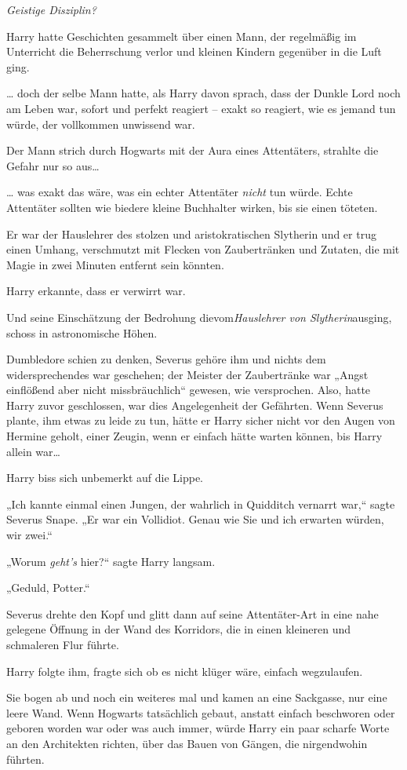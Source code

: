 {\emph{Geistige Disziplin?}

Harry hatte Geschichten gesammelt über einen Mann, der regelmäßig im Unterricht die Beherrschung verlor und kleinen Kindern gegenüber in die Luft ging.

… doch der selbe Mann hatte, als Harry davon sprach, dass der Dunkle Lord noch am Leben war, sofort und perfekt reagiert -- exakt so reagiert, wie es jemand tun würde, der vollkommen unwissend war.

Der Mann strich durch Hogwarts mit der Aura eines Attentäters, strahlte die Gefahr nur so aus…

… was exakt das wäre, was ein echter Attentäter \emph{nicht} tun würde. Echte Attentäter sollten wie biedere kleine Buchhalter wirken, bis sie einen töteten.

Er war der Hauslehrer des stolzen und aristokratischen Slytherin und er trug einen Umhang, verschmutzt mit Flecken von Zaubertränken und Zutaten, die mit Magie in zwei Minuten entfernt sein könnten.

Harry erkannte, dass er verwirrt war.

Und seine Einschätzung der Bedrohung dievom\emph{Hauslehrer von Slytherin}ausging, schoss in astronomische Höhen.

Dumbledore schien zu denken, Severus gehöre ihm und nichts dem widersprechendes war geschehen; der Meister der Zaubertränke war „Angst einflößend aber nicht missbräuchlich“ gewesen, wie versprochen. Also, hatte Harry zuvor geschlossen, war dies Angelegenheit der Gefährten. Wenn Severus plante, ihm etwas zu leide zu tun, hätte er Harry sicher nicht vor den Augen von Hermine geholt, einer Zeugin, wenn er einfach hätte warten können, bis Harry allein war…

Harry biss sich unbemerkt auf die Lippe.

„Ich kannte einmal einen Jungen, der wahrlich in Quidditch vernarrt war,“ sagte Severus Snape. „Er war ein Vollidiot. Genau wie Sie und ich erwarten würden, wir zwei.“

„Worum \emph{geht's} hier?“ sagte Harry langsam.

„Geduld, Potter.“

Severus drehte den Kopf und glitt dann auf seine Attentäter-Art in eine nahe gelegene Öffnung in der Wand des Korridors, die in einen kleineren und schmaleren Flur führte.

Harry folgte ihm, fragte sich ob es nicht klüger wäre, einfach wegzulaufen.

Sie bogen ab und noch ein weiteres mal und kamen an eine Sackgasse, nur eine leere Wand. Wenn Hogwarts tatsächlich gebaut, anstatt einfach beschworen oder geboren worden war oder was auch immer, würde Harry ein paar scharfe Worte an den Architekten richten, über das Bauen von Gängen, die nirgendwohin führten.

}

